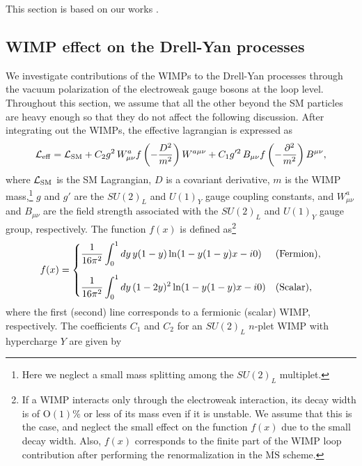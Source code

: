 \documentclass[12pt,twoside,book]{article}
\begin{document}
This section is based on our works \cite{Chigusa:2018vxz, Abe:2019egv}.


\subsection{WIMP effect on the Drell-Yan processes}
\label{sec:WIMP}

We investigate contributions of the WIMPs to the Drell-Yan processes through the vacuum polarization of the electroweak gauge bosons at the loop level.
Throughout this section, we assume that all the other beyond the SM particles are heavy enough so that they do not affect the following discussion.
After integrating out the WIMPs, the effective lagrangian is expressed as
\begin{align}
 \mathcal{L}_{\rm eff} = \mathcal{L}_{\rm SM} + C_2 g^2\, W_{\mu \nu}^a
 f\left(-\frac{D^2}{m^2}\right) W^{a\mu\nu} + C_1 g'^2\, B_{\mu\nu}
 f\left(-\frac{\partial^2}{m^2}\right) B^{\mu\nu},\label{eq_lag}
\end{align}
where $\mathcal{L}_{\rm SM}$ is the SM Lagrangian, $D$ is a covariant derivative, $m$ is the WIMP mass,\footnote
{
  Here we neglect a small mass splitting among the $SU(2)_L$ multiplet.
}
$g$ and $g'$ are the $SU(2)_L$ and $U(1)_Y$ gauge coupling constants, and $W_{\mu\nu}^a$ and $B_{\mu\nu}$ are the field strength associated with the $SU(2)_L$ and $U(1)_Y$ gauge group, respectively.
The function $f(x)$ is defined as\footnote
{
  If a WIMP interacts only through the electroweak interaction, its decay width is of $\mathrm{O}(1)\%$ or less of its mass even if it is unstable.
  We assume that this is the case, and neglect the small effect on the function $f(x)$ due to the small decay width.
  Also, $f(x)$ corresponds to the finite part of the WIMP loop contribution after performing the renormalization in the $\overline{\mathrm{MS}}$ scheme.
}
\begin{align}
 f(x) = \begin{cases}
	 \displaystyle{\frac{1}{16\pi^2} \int_0^1 dy\, y(1-y) \ln (1 -
	 y(1-y)x - i0)} & {\rm (Fermion)},\\[5mm]
	 \displaystyle{\frac{1}{16\pi^2} \int_0^1 dy\, (1-2y)^2 \ln (1-
	 y(1-y)x - i0)} & {\rm (Scalar)},
	\end{cases}\label{eq_f}
\end{align}
where the first (second) line corresponds to a fermionic (scalar) WIMP, respectively.
The coefficients $C_1$ and $C_2$ for an $SU(2)_L$ $n$-plet WIMP with hypercharge $Y$ are given by
\end{document}
